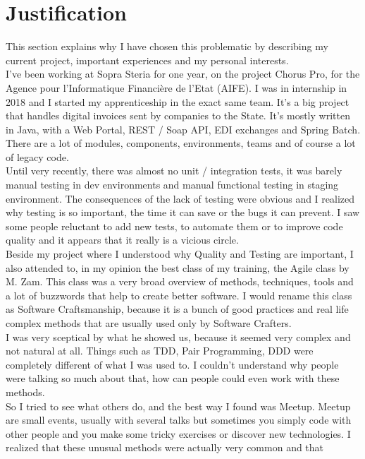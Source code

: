\section{Justification}\label{sec:justification}
This section explains why I have chosen this problematic by describing
my current project, important experiences and my personal interests. \\
I've been working at Sopra Steria for one year, on the project
Chorus Pro, for the Agence pour l'Informatique Financi\`{e}re de l'Etat
(AIFE).
I was in internship in 2018 and I started my apprenticeship in the exact
same team.
It's a big project that handles digital invoices sent by companies to the
State.
It's mostly written in Java, with a Web Portal, REST / Soap API, EDI
exchanges and Spring Batch.
There are a lot of modules, components, environments, teams and of course
a lot of legacy code. \\
Until very recently, there was almost no unit / integration tests, it was
barely manual testing in dev environments and manual functional testing
in staging environment.
The consequences of the lack of testing were obvious and I realized why
testing is so important, the time it can save or the bugs it can prevent.
I saw some people reluctant to add new tests, to automate them or to
improve code quality and it appears that it really is a vicious circle.
\\
\newline
Beside my project where I understood why Quality and Testing are
important, I also attended to, in my opinion the best class of my
training, the Agile class by M. Zam.
This class was a very broad overview of methods, techniques, tools and a
lot of buzzwords that help to create better software.
I would rename this class as Software Craftsmanship, because it is a
bunch of good practices and real life complex methods that are usually
used only by Software Crafters. \\
I was very sceptical by what he showed us, because it seemed very complex
and not natural at all.
Things such as TDD, Pair Programming, DDD were completely different of
what I was used to.
I couldn't understand why people were talking so much about that, how can
people could even work with these methods. \\
So I tried to see what others do, and the best way I found was Meetup.
Meetup are small events, usually with several talks but sometimes you
simply code with other people and you make some tricky exercises or
discover new technologies.
I realized that these unusual methods were actually very common and that

